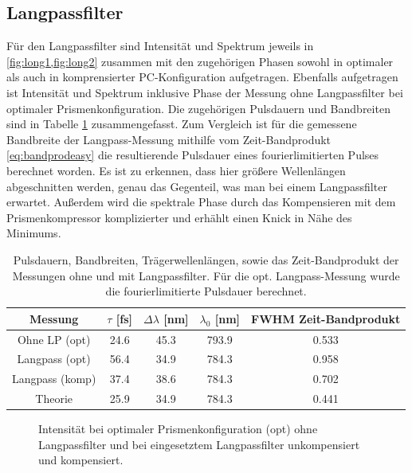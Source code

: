 \documentclass[twoside,        %
               BCOR12mm,       %
               english,ngerman, %
               fleqn,headsepline=false,footsepline=false
              ]{Vorlage/MFPREPORT}
\begin{document}
\subsection{Langpassfilter}
Für den Langpassfilter sind Intensität und Spektrum jeweils in
\cref{fig:long1,fig:long2} zusammen mit den zugehörigen Phasen sowohl in
optimaler als auch in komprensierter PC-Konfiguration aufgetragen.
Ebenfalls aufgetragen ist Intensität und Spektrum inklusive Phase der Messung
ohne Langpassfilter bei optimaler Prismenkonfiguration. Die zugehörigen
Pulsdauern und Bandbreiten sind in Tabelle \cref{tab:long} zusammengefasst.
Zum Vergleich ist für die gemessene Bandbreite der Langpass-Messung mithilfe
vom Zeit-Bandprodukt \cref{eq:bandprodeasy} die resultierende Pulsdauer eines
fourierlimitierten Pulses berechnet worden. Es ist zu erkennen, dass hier
größere Wellenlängen abgeschnitten werden, genau das Gegenteil, was man bei
einem Langpassfilter erwartet. Außerdem wird die spektrale Phase durch das
Kompensieren mit dem Prismenkompressor komplizierter und erhählt einen Knick in
Nähe des Minimums.


\begin{table}
    \centering
    \begin{tabular}[]{|c||c|c|c|c|}
        \hline
        Messung&$\tau$ [fs]&$\Delta\lambda$ [nm]&$\lambda_0$ [nm]&FWHM Zeit-Bandprodukt\\\hline
        Ohne LP (opt)&24.6&45.3&793.9&0.533\\\hline
        Langpass (opt)&56.4&34.9&784.3&0.958\\\hline
        Langpass (komp)&37.4&38.6&784.3&0.702\\\hline\hline
        Theorie &25.9&34.9&784.3&0.441\\\hline

    \end{tabular}
    \caption{Pulsdauern, Bandbreiten, Trägerwellenlängen, sowie das
    Zeit-Bandprodukt der Messungen ohne und mit Langpassfilter. Für die opt.
Langpass-Messung wurde die fourierlimitierte Pulsdauer berechnet. }
    \label{tab:long}
\end{table}


\begin{figure}[]
    \begin{center}
        
    \end{center}
    \caption{Intensität bei optimaler Prismenkonfiguration (opt) ohne
    Langpassfilter und bei
    eingesetztem Langpassfilter unkompensiert und kompensiert.}
    \label{fig:long1}
\end{figure}
\end{document}
